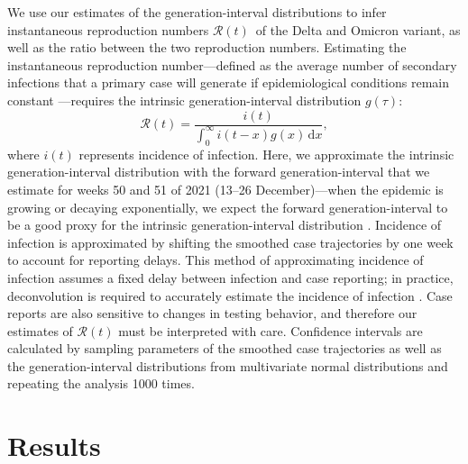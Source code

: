 \documentclass[12pt]{article}
\newcommand{\comment}{\showcomment}
\newcommand{\showcomment}[3]{\textcolor{#1}{\textbf{[#2: }\textsl{#3}\textbf{]}}}
\newcommand{\jd}[1]{\comment{cyan}{JD}{#1}}
\newcommand{\swp}[1]{\comment{magenta}{SWP}{#1}}
\newcommand{\Rt}{\ensuremath{{\mathcal R}(t)}\xspace}
\newcommand{\dd}[1]{\ensuremath{\, \mathrm{d}#1}}
\newcommand{\dx}{\dd{x}}
\begin{document}
We use our estimates of the generation-interval distributions to infer instantaneous reproduction numbers \Rt\ of the Delta and Omicron variant, as well as the ratio between the two reproduction numbers.
Estimating the instantaneous reproduction number---defined as the average number of secondary infections that a primary case will generate if epidemiological conditions remain constant \citep{fraser2007estimating}---requires the intrinsic generation-interval distribution $g(\tau)$:
\begin{equation}
\Rt = \frac{i(t)}{\int_0^\infty i(t-x) g(x) \dx},
\end{equation}
where $i(t)$ represents incidence of infection.
Here, we approximate the intrinsic generation-interval distribution with the forward generation-interval that we estimate for weeks 50 and 51 of 2021 (13--26 December)---when the epidemic is growing or decaying exponentially, we expect the forward generation-interval to be a good proxy for the intrinsic generation-interval distribution \citep{champredon2015intrinsic, park2020inferring}.
Incidence of infection is approximated by shifting the smoothed case trajectories by one week to account for reporting delays.
This method of approximating incidence of infection assumes a fixed delay between infection and case reporting;
in practice, deconvolution is required to accurately estimate the incidence of infection \citep{goldstein2009reconstructing}.
Case reports are also sensitive to changes in testing behavior, and therefore our estimates of $\Rt$ must be interpreted with care.
Confidence intervals are calculated by sampling parameters of the smoothed case trajectories as well as the generation-interval distributions from multivariate normal distributions and repeating the analysis 1000 times.

\section{Results}
\end{document}
